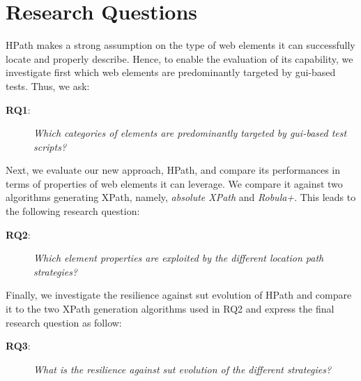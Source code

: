 \section{Research Questions}
\label{sec:hpath-rqs}

HPath makes a strong assumption on the type of web elements it can successfully locate and properly describe. Hence, to enable the evaluation of its capability, we investigate first which web elements are predominantly targeted by \gls{gui}-based tests. Thus, we ask:

\begin{description} 
\item[\textbf{RQ1}:]
\emph{Which categories of elements are predominantly targeted by \gls{gui}-based test scripts?} 
\end{description} 

Next, we evaluate our new approach, HPath, and compare its performances in terms of properties of web elements it can leverage. We compare it against two algorithms generating XPath, namely, \emph{absolute XPath} and \emph{Robula+}. This leads to the following research question:

\begin{description} 
\item[\textbf{RQ2}:]
\emph{Which element properties are exploited by the different location path strategies?} 
\end{description} 
        
Finally, we investigate the resilience against \gls{sut} evolution of HPath and compare it to the two XPath generation algorithms used in RQ2 and express the final research question as follow:

\begin{description} 
\item[\textbf{RQ3}:]
\emph{What is the resilience against \gls{sut} evolution of the different strategies?} 
\end{description} 